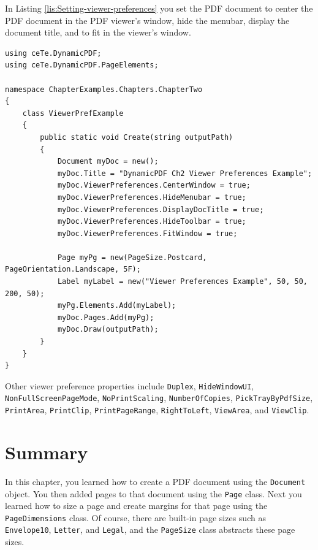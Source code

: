\documentclass[american,letterpaper]{tufte-book}
\numberwithin{equation}{section}
\numberwithin{figure}{section}
\begin{document}
In Listing \ref{lis:Setting-viewer-preferences} you set the PDF document to center the PDF document in the PDF viewer's window, hide the menubar, display the document title, and to fit in the viewer's window.
\bgroup{}
\begin{lstlisting}[caption={Setting viewer preferences.},label={lis:Setting-viewer-preferences},basicstyle={\small\ttfamily},breaklines=true]
using ceTe.DynamicPDF;
using ceTe.DynamicPDF.PageElements;

namespace ChapterExamples.Chapters.ChapterTwo
{
    class ViewerPrefExample
    {
        public static void Create(string outputPath)
        {
            Document myDoc = new();
            myDoc.Title = "DynamicPDF Ch2 Viewer Preferences Example";
            myDoc.ViewerPreferences.CenterWindow = true;
            myDoc.ViewerPreferences.HideMenubar = true;
            myDoc.ViewerPreferences.DisplayDocTitle = true;
            myDoc.ViewerPreferences.HideToolbar = true;
            myDoc.ViewerPreferences.FitWindow = true;

            Page myPg = new(PageSize.Postcard, PageOrientation.Landscape, 5F);
            Label myLabel = new("Viewer Preferences Example", 50, 50, 200, 50);
            myPg.Elements.Add(myLabel);
            myDoc.Pages.Add(myPg);
            myDoc.Draw(outputPath);
        }
    }
}
\end{lstlisting}
\leavevmode\egroup

Other viewer preference properties include \texttt{Duplex}, \texttt{HideWindowUI},
\texttt{NonFullScreenPageMode}, \texttt{NoPrintScaling}, \texttt{NumberOfCopies},
\texttt{PickTrayByPdfSize}, \texttt{PrintArea}, \texttt{PrintClip},
\texttt{PrintPageRange}, \texttt{RightToLeft}, \texttt{ViewArea},
and \texttt{ViewClip}. 

\section{Summary}

In this chapter, you learned how to create a PDF document using the
\texttt{Document} object. You then added pages to that document using
the \texttt{Page} class. Next you learned how to size a page and create
margins for that page using the \texttt{PageDimensions} class. Of
course, there are built-in page sizes such as \texttt{Envelope10},
\texttt{Letter}, and \texttt{Legal}, and the \texttt{PageSize} class
abstracts these page sizes. 
\end{document}
